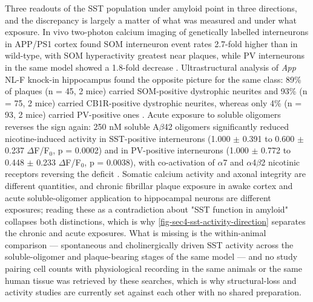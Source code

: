 \documentclass[11pt]{article}
\begin{document}
Three readouts of the SST population under amyloid point in three directions, and the discrepancy is largely a matter of what was measured and under what exposure. In vivo two-photon calcium imaging of genetically labelled interneurons in APP/PS1 cortex found SOM interneuron event rates 2.7-fold higher than in wild-type, with SOM hyperactivity greatest near plaques, while PV interneurons in the same model showed a 1.8-fold decrease \citep{Algamal2022b,Algamal2022a}. Ultrastructural analysis of \emph{App} NL-F knock-in hippocampus found the opposite picture for the same class: 89\% of plaques (n = 45, 2 mice) carried SOM-positive dystrophic neurites and 93\% (n = 75, 2 mice) carried CB1R-positive dystrophic neurites, whereas only 4\% (n = 93, 2 mice) carried PV-positive ones \citep{Sos2020}. Acute exposure to soluble oligomers reverses the sign again: 250 nM soluble A$\beta$42 oligomers significantly reduced nicotine-induced activity in SST-positive interneurons (1.000 $\pm$ 0.391 to 0.600 $\pm$ 0.237 $\Delta$F/F$_{0}$, p = 0.0002) and in PV-positive interneurons (1.000 $\pm$ 0.772 to 0.448 $\pm$ 0.233 $\Delta$F/F$_{0}$, p = 0.0038), with co-activation of $\alpha$7 and $\alpha$4$\beta$2 nicotinic receptors reversing the deficit \citep{Lee2026}. Somatic calcium activity and axonal integrity are different quantities, and chronic fibrillar plaque exposure in awake cortex and acute soluble-oligomer application to hippocampal neurons are different exposures; reading these as a contradiction about "SST function in amyloid" collapses both distinctions, which is why \ref{fig-sec4-sst-activity-direction} separates the chronic and acute exposures. What is missing is the within-animal comparison --- spontaneous and cholinergically driven SST activity across the soluble-oligomer and plaque-bearing stages of the same model --- and no study pairing cell counts with physiological recording in the same animals or the same human tissue was retrieved by these searches, which is why structural-loss and activity studies are currently set against each other with no shared preparation.
\end{document}

